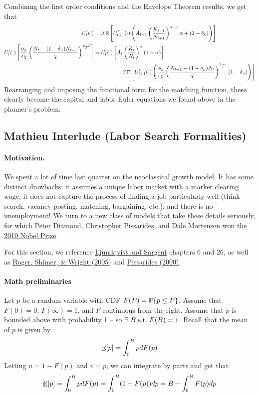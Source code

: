 \documentclass[10pt]{article}
\begin{document}
Combining the first order conditions and the Envelope Theorem results, we get that
\begin{align*}
	U_t'(\cdot) &= \beta \mathop{\mathbb{E}} \left[ U'_{t+1}(\cdot) \left( A_{t+1} \left( \frac{K_{t+1}}{N_{t+1}}\right)^{\alpha - 1} \alpha + (1-\delta_k) \right) \right] \\
	U_t'(\cdot) \left[ \frac{\phi_n}{\varepsilon\chi} \left( \frac{N_t - (1-\delta_n)N_{t-1}}{\chi}\right)^\frac{1-\varepsilon}{\varepsilon} \right] &= U'_t(\cdot)\left[ A_t \left( \frac{K_t}{N_t}\right)^{\alpha}(1-\alpha) \right] \\
	&\qquad \qquad+ \beta \mathop{\mathbb{E}}\left[ U'_{t+1}(\cdot) \left( \frac{\phi_n}{\varepsilon\chi} \left( \frac{N_{t+1} - (1-\delta_n)N_{t}}{\chi}\right)^\frac{1-\varepsilon}{\varepsilon}(1-\delta_n)\right) \right]
\end{align*}
Rearranging and imposing the functional form for the matching function, these clearly become the capital and labor Euler equations we found above in the planner's problem.



\subsection{Mathieu Interlude (Labor Search Formalities)}

\paragraph{Motivation.} We spent a lot of time last quarter on the neoclassical growth model. It has some distinct drawbacks: it assumes a unique labor market with a market clearing wage; it does not capture the process of finding a job particularly well (think search, vacancy posting, matching, bargaining, etc.); and there is no unemployment! We turn to a new class of models that take these details seriously, for which Peter Diamond, Christopher Pissarides, and Dale Mortensen won the \href{https://www.nobelprize.org/prizes/economic-sciences/2010/summary/}{2010 Nobel Prize}. 

For this section, we reference \href{https://mitpress.mit.edu/9780262038669/recursive-macroeconomic-theory/}{Ljundqvist and Sargent} chapters 6 and 26, as well as \href{https://www.aeaweb.org/articles?id=10.1257/002205105775362014}{Roger, Shimer, \& Wright (2005)} and \href{https://mitpress.mit.edu/9780262533980/equilibrium-unemployment-theory/}{Pissarides (2000)}.

\paragraph{Math preliminaries} Let $p$ be a random variable with CDF $F(P) = \mathbb{P}\{p \le P\}$. Assume that $F(0) = 0$, $F(\infty) = 1$, and $F$ continuous from the right. Assume that $p$ is bounded above with probability 1 -- so $\exists B \st F(B) = 1$. Recall that the mean of $p$ is given by
\[
\mathop{\mathbb{E}}[p] = \int_0^B pdF(p)
\]
Letting $u = 1- F(p)$ and $v = p$, we can integrate by parts and get that
\[
\mathop{\mathbb{E}}[p] = \int_0^B pdF(p) = \int_0^B (1-F(p)) dp = B - \int_0^B F(p)dp
\]
\end{document}
